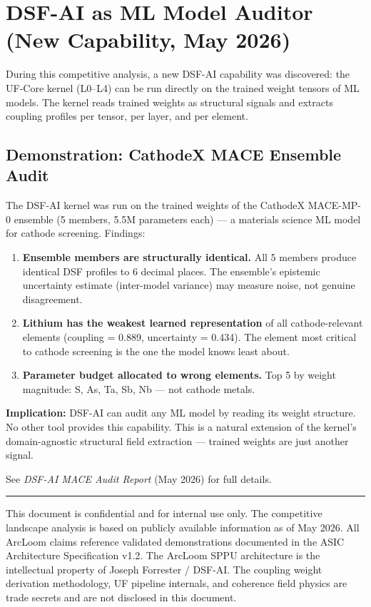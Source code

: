 \documentclass[11pt, a4paper]{article}
\begin{document}
\section{DSF-AI as ML Model Auditor (New Capability, May 2026)}

During this competitive analysis, a new DSF-AI capability was
discovered: the UF-Core kernel (L0--L4) can be run directly on the
trained weight tensors of ML models. The kernel reads trained weights
as structural signals and extracts coupling profiles per tensor,
per layer, and per element.

\subsection{Demonstration: CathodeX MACE Ensemble Audit}

The DSF-AI kernel was run on the trained weights of the CathodeX
MACE-MP-0 ensemble (5 members, 5.5M parameters each) --- a materials
science ML model for cathode screening. Findings:

\begin{enumerate}[nosep]
  \item \textbf{Ensemble members are structurally identical.}
        All 5 members produce identical DSF profiles to 6 decimal
        places. The ensemble's epistemic uncertainty estimate
        (inter-model variance) may measure noise, not genuine
        disagreement.
  \item \textbf{Lithium has the weakest learned representation}
        of all cathode-relevant elements (coupling = 0.889,
        uncertainty = 0.434). The element most critical to cathode
        screening is the one the model knows least about.
  \item \textbf{Parameter budget allocated to wrong elements.}
        Top 5 by weight magnitude: S, As, Ta, Sb, Nb --- not
        cathode metals.
\end{enumerate}

\textbf{Implication:} DSF-AI can audit any ML model by reading its
weight structure. No other tool provides this capability. This is a
natural extension of the kernel's domain-agnostic structural field
extraction --- trained weights are just another signal.

See \textit{DSF-AI MACE Audit Report} (May 2026) for full details.

\vspace{2em}
\hrule
\vspace{0.5em}
{\color{tfe-gray}\small This document is confidential and for internal
use only. The competitive landscape analysis is based on publicly
available information as of May 2026. All ArcLoom claims reference
validated demonstrations documented in the ASIC Architecture
Specification v1.2. The ArcLoom SPPU architecture is the intellectual
property of Joseph Forrester / DSF-AI. The coupling weight derivation
methodology, UF pipeline internals, and coherence field physics are
trade secrets and are not disclosed in this document.}
\end{document}
